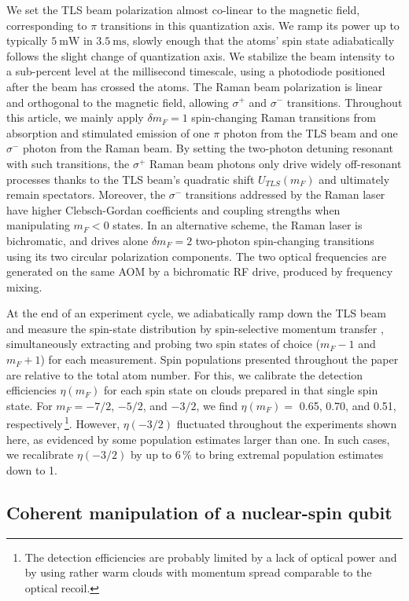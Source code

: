 We set the TLS beam polarization almost co-linear to the magnetic field, corresponding to $\pi$ transitions in this quantization axis. We ramp its power up to typically $\SI{5}{\milli \watt}$ in $\SI{3.5}{\milli \second}$, slowly enough that the atoms' spin state adiabatically follows the slight change of quantization axis. We stabilize the beam intensity to a sub-percent level at the millisecond timescale, using a photodiode positioned after the beam has crossed the atoms. The Raman beam polarization is linear and orthogonal to the magnetic field, allowing $\sigma^+$ and $\sigma^-$ transitions. Throughout this article, we mainly apply $\delta m_F = 1$ spin-changing Raman transitions from absorption and stimulated emission of one $\pi$ photon from the TLS beam and one $\sigma^-$ photon from the Raman beam. By setting the two-photon detuning resonant with such transitions, the $\sigma^+$ Raman beam photons only drive widely off-resonant processes thanks to the TLS beam's quadratic shift $U_{TLS}(m_F)$ and ultimately remain spectators. Moreover, the $\sigma^-$ transitions addressed by the Raman laser have higher Clebsch-Gordan coefficients and coupling strengths when manipulating $m_F <0$ states. In an alternative scheme, the Raman laser is bichromatic, and drives alone $\delta m_F = 2$ two-photon spin-changing transitions using its two circular polarization components. The two optical frequencies are generated on the same AOM by a bichromatic RF drive, produced by frequency mixing.

At the end of an experiment cycle, we adiabatically ramp down the TLS beam and measure the spin-state distribution by spin-selective momentum transfer \cite{Bataille2020}, simultaneously extracting and probing two spin states of choice ($m_F-1$ and $m_F+1$) for each measurement. Spin populations presented throughout the paper are relative to the total atom number. For this, we calibrate the detection efficiencies $\eta(m_F)$ for each spin state on clouds prepared in that single spin state. For  $m_F = -7/2$, $-5/2$, and $-3/2$, we find $\eta(m_F) = $ 0.65, 0.70, and 0.51, respectively\,\footnote{The detection efficiencies are probably limited by a lack of optical power and by using rather warm clouds with momentum spread comparable to the optical recoil.}. However, $\eta(-3/2)$ fluctuated throughout the experiments shown here, as evidenced by some population estimates larger than one. In such cases, we recalibrate $\eta(-3/2)$ by up to $6\,\%$ to bring extremal population estimates down to 1.

\subsection{Coherent manipulation of a nuclear-spin qubit}
\label{Sec:CoherentManipulation}

